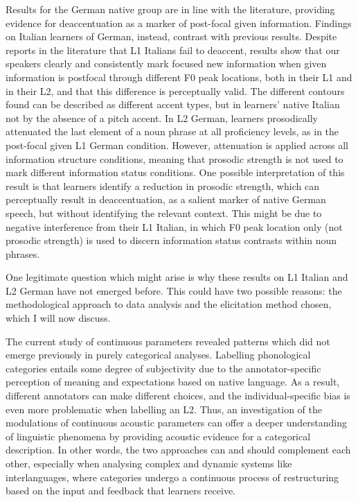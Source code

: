 Results for the German native group are in line with the literature, providing evidence for deaccentuation as a marker of post-focal given information. Findings on Italian learners of German, instead, contrast with previous results. Despite reports in the literature that L1 Italians fail to deaccent, results show that our speakers clearly and consistently mark focused new information when given information is postfocal through different F0 peak locations, both in their L1 and in their L2, and that this difference is perceptually valid. The different contours found can be described as different accent types, but in learners’ native Italian not by the absence of a pitch accent. In L2 German, learners prosodically attenuated the last element of a noun phrase at all proficiency levels, as in the post-focal given L1 German condition. However, attenuation is applied across all information structure conditions, meaning that prosodic strength is not used to mark different information status conditions. One possible interpretation of this result is that learners identify a reduction in prosodic strength, which can perceptually result in deaccentuation, as a salient marker of native German speech, but without identifying the relevant context. This might be due to negative interference from their L1 Italian, in which F0 peak location only (not prosodic strength) is used to discern information status contrasts within noun phrases.

One legitimate question which might arise is why these results on L1 Italian and L2 German have not emerged before. This could have two possible reasons: the methodological approach to data analysis and the elicitation method chosen, which I will now discuss.

The current study of continuous parameters revealed patterns which did not emerge previously in purely categorical analyses. Labelling phonological categories entails some degree of subjectivity due to the annotator-specific perception of meaning and expectations based on native language. As a result, different annotators can make different choices, and the individual-specific bias is even more problematic when labelling an L2. Thus, an investigation of the modulations of continuous acoustic parameters can offer a deeper understanding of linguistic phenomena by providing acoustic evidence for a categorical description. In other words, the two approaches can and should complement each other, especially when analysing complex and dynamic systems like interlanguages, where categories undergo a continuous process of restructuring based on the input and feedback that learners receive.


